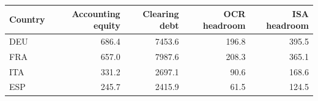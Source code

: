 \begin{tabular*}{\textwidth}{@{\extracolsep{\fill}}lrrrr@{}}
\toprule
Country & Accounting equity & Clearing debt & OCR headroom & ISA headroom \\
\midrule
DEU & 686.4 & 7453.6 & 196.8 & 395.5 \\
FRA & 657.0 & 7987.6 & 208.3 & 365.1 \\
ITA & 331.2 & 2697.1 & 90.6 & 168.6 \\
ESP & 245.7 & 2415.9 & 61.5 & 124.5 \\
\bottomrule
\end{tabular*}
